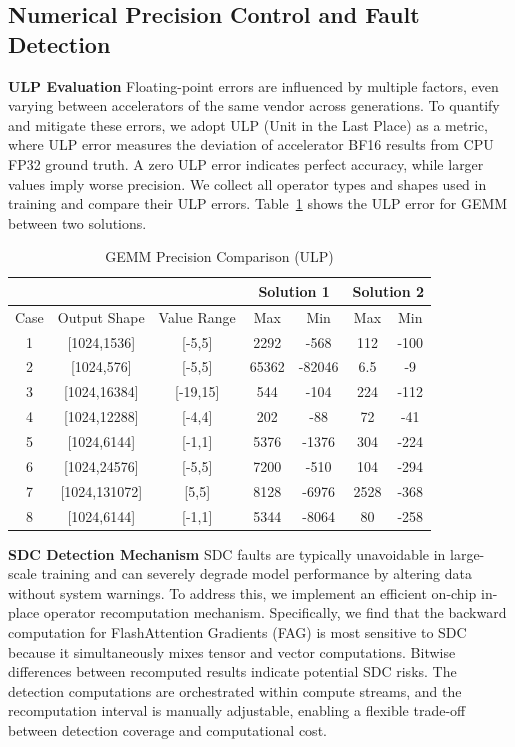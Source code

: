 \documentclass{article}
\newcommand{\chip}{accelerators\xspace}
\begin{document}
\subsection{Numerical Precision Control and Fault Detection}
\textbf{ULP Evaluation} Floating-point errors are influenced by multiple factors, even varying between \chip of the same vendor across generations. To quantify and mitigate these errors, we adopt ULP (Unit in the Last Place) as a metric, where ULP error measures the deviation of accelerator BF16 results from CPU FP32 ground truth. A zero ULP error indicates perfect accuracy, while larger values imply worse precision. We collect all operator types and shapes used in training and compare their ULP errors. Table~\ref{tab:gemm ulp} shows the ULP error for GEMM between two solutions.

\begin{table}[h!]
    \centering
    \caption{GEMM Precision Comparison (ULP)}
    \begin{tabular}{ccccccc}\toprule
 & & & \multicolumn{2}{c}{Solution 1}& \multicolumn{2}{c}{Solution 2}\\\midrule
         Case&  Output Shape&  Value Range&  Max&  Min&  Max&  Min\\
         1&  [1024,1536]&  [-5,5]&    2292&  -568&  112&  -100\\
         2&  [1024,576]&  [-5,5]& 65362&  -82046& 6.5&  -9  \\
         3&  [1024,16384]&  [-19,15]&   544&  -104& 224&  -112 \\
         4&  [1024,12288]&  [-4,4]& 202&  -88& 72&  -41 \\
         5&  [1024,6144]&  [-1,1]&  5376&  -1376& 304&  -224\\
         6&  [1024,24576]&  [-5,5]&  7200&  -510& 104&  -294\\
 7& [1024,131072]& [5,5]& 8128& -6976& 2528& -368 \\
 8& [1024,6144]& [-1,1]& 5344& -8064& 80& -258 \\ \bottomrule
    \end{tabular}
    \label{tab:gemm ulp}
\end{table}

\textbf{SDC Detection Mechanism} SDC faults are typically unavoidable in large-scale training and can severely degrade model performance by altering data without system warnings. To address this, we implement an efficient on-chip in-place operator recomputation mechanism. Specifically, we find that the backward computation for FlashAttention Gradients (FAG) is most sensitive to SDC because it simultaneously mixes tensor and vector computations. Bitwise differences between recomputed results indicate potential SDC risks. The detection computations are orchestrated within compute streams, and the recomputation interval is manually adjustable, enabling a flexible trade-off between detection coverage and computational cost.
\end{document}
